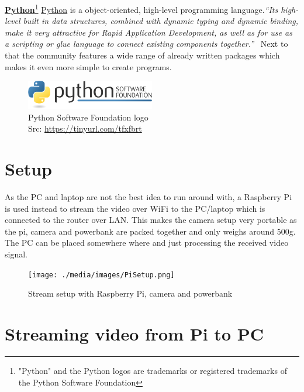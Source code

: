 \textbf{\underline{Python}}\footnote{"Python" and the Python logos are trademarks or registered trademarks of the Python Software Foundation} \newline
\href{https://www.python.org}{Python}\cite{PythonHomepage} is a object-oriented, high-level programming language.\emph{\enquote{Its high-level built in data structures, combined with dynamic typing and dynamic binding, make it very attractive for Rapid Application Development, as well as for use as a scripting or glue language to connect existing components together.}}~\cite{WhatIsPython} Next to that the community features a wide range of already written packages which makes it even more simple to create programs.\newline
\begin{figure}[h]
	\centering
	\includegraphics[width=0.5\textwidth]{./media/images/python_logo.png}
  	\caption{Python Software Foundation logo\texttrademark
  	\\Src: \url{https://tinyurl.com/tfxfbrt}}
  	\label{img:raspiconfig}
\end{figure}


\section{Setup\authorA}
As the PC and laptop are not the best idea to run around with, a Raspberry Pi is used instead to stream the video over WiFi to the PC/laptop which is connected to the router over LAN. This makes the camera setup very portable as the pi, camera and powerbank are packed together and only weighs around 500g. The PC can be placed somewhere where and just processing the received video signal.\newline
\begin{figure}[h]
	\centering
	\texttt{[image: ./media/images/PiSetup.png]}
  	\caption{Stream setup with Raspberry Pi, camera and powerbank}
  	\label{picamssetup}
\end{figure}

\section{Streaming video from Pi to PC\authorA}

